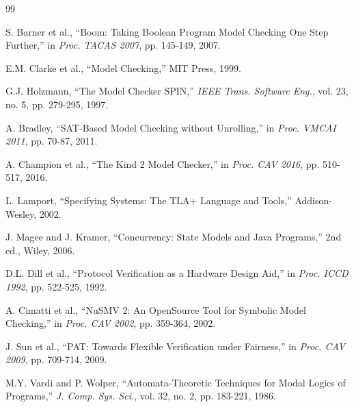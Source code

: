 \documentclass[conference]{IEEEtran}
\begin{document}
\begin{thebibliography}{99}

S. Barner et al., ``Boom: Taking Boolean Program Model Checking One Step Further,'' in \textit{Proc. TACAS 2007}, pp. 145-149, 2007.

E.M. Clarke et al., ``Model Checking,'' MIT Press, 1999.

G.J. Holzmann, ``The Model Checker SPIN,'' \textit{IEEE Trans. Software Eng.}, vol. 23, no. 5, pp. 279-295, 1997.

A. Bradley, ``SAT-Based Model Checking without Unrolling,'' in \textit{Proc. VMCAI 2011}, pp. 70-87, 2011.

A. Champion et al., ``The Kind 2 Model Checker,'' in \textit{Proc. CAV 2016}, pp. 510-517, 2016.

L. Lamport, ``Specifying Systems: The TLA+ Language and Tools,'' Addison-Wesley, 2002.

J. Magee and J. Kramer, ``Concurrency: State Models and Java Programs,'' 2nd ed., Wiley, 2006.

D.L. Dill et al., ``Protocol Verification as a Hardware Design Aid,'' in \textit{Proc. ICCD 1992}, pp. 522-525, 1992.

A. Cimatti et al., ``NuSMV 2: An OpenSource Tool for Symbolic Model Checking,'' in \textit{Proc. CAV 2002}, pp. 359-364, 2002.

J. Sun et al., ``PAT: Towards Flexible Verification under Fairness,'' in \textit{Proc. CAV 2009}, pp. 709-714, 2009.

M.Y. Vardi and P. Wolper, ``Automata-Theoretic Techniques for Modal Logics of Programs,'' \textit{J. Comp. Sys. Sci.}, vol. 32, no. 2, pp. 183-221, 1986.

\end{thebibliography}
\end{document}
